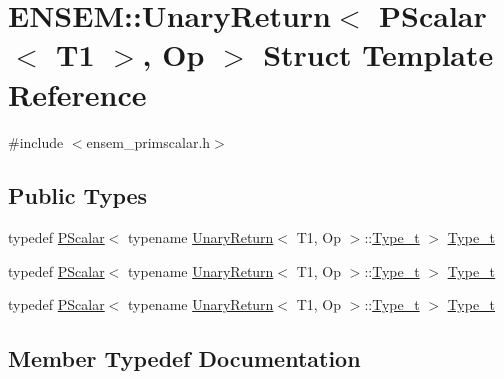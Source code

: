 \hypertarget{structENSEM_1_1UnaryReturn_3_01PScalar_3_01T1_01_4_00_01Op_01_4}{}\section{E\+N\+S\+EM\+:\+:Unary\+Return$<$ P\+Scalar$<$ T1 $>$, Op $>$ Struct Template Reference}
\label{structENSEM_1_1UnaryReturn_3_01PScalar_3_01T1_01_4_00_01Op_01_4}


{\ttfamily \#include $<$ensem\+\_\+primscalar.\+h$>$}

\subsection*{Public Types}
\begin{DoxyCompactItemize}
\item 
typedef \mbox{\hyperlink{classENSEM_1_1PScalar}{P\+Scalar}}$<$ typename \mbox{\hyperlink{structENSEM_1_1UnaryReturn}{Unary\+Return}}$<$ T1, Op $>$\+::\mbox{\hyperlink{structENSEM_1_1UnaryReturn_3_01PScalar_3_01T1_01_4_00_01Op_01_4_a75130a6bdc9f60586c1614ed4177aa96}{Type\+\_\+t}} $>$ \mbox{\hyperlink{structENSEM_1_1UnaryReturn_3_01PScalar_3_01T1_01_4_00_01Op_01_4_a75130a6bdc9f60586c1614ed4177aa96}{Type\+\_\+t}}
\item 
typedef \mbox{\hyperlink{classENSEM_1_1PScalar}{P\+Scalar}}$<$ typename \mbox{\hyperlink{structENSEM_1_1UnaryReturn}{Unary\+Return}}$<$ T1, Op $>$\+::\mbox{\hyperlink{structENSEM_1_1UnaryReturn_3_01PScalar_3_01T1_01_4_00_01Op_01_4_a75130a6bdc9f60586c1614ed4177aa96}{Type\+\_\+t}} $>$ \mbox{\hyperlink{structENSEM_1_1UnaryReturn_3_01PScalar_3_01T1_01_4_00_01Op_01_4_a75130a6bdc9f60586c1614ed4177aa96}{Type\+\_\+t}}
\item 
typedef \mbox{\hyperlink{classENSEM_1_1PScalar}{P\+Scalar}}$<$ typename \mbox{\hyperlink{structENSEM_1_1UnaryReturn}{Unary\+Return}}$<$ T1, Op $>$\+::\mbox{\hyperlink{structENSEM_1_1UnaryReturn_3_01PScalar_3_01T1_01_4_00_01Op_01_4_a75130a6bdc9f60586c1614ed4177aa96}{Type\+\_\+t}} $>$ \mbox{\hyperlink{structENSEM_1_1UnaryReturn_3_01PScalar_3_01T1_01_4_00_01Op_01_4_a75130a6bdc9f60586c1614ed4177aa96}{Type\+\_\+t}}
\end{DoxyCompactItemize}


\subsection{Member Typedef Documentation}
\mbox{\label{structENSEM_1_1UnaryReturn_3_01PScalar_3_01T1_01_4_00_01Op_01_4_a75130a6bdc9f60586c1614ed4177aa96}} 
